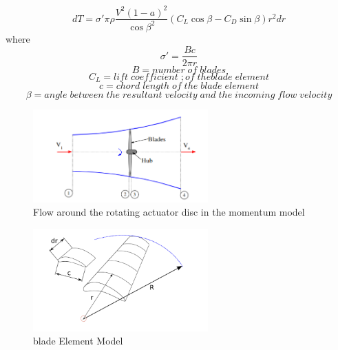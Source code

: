 \documentclass[main.tex]{subfiles}
\begin{document}
$$
dT = \sigma' \pi \rho \frac{V^{2}(1 - a)^2}{\cos{\beta}^2}(C_{L} \cos{\beta} - C_{D} \sin{\beta})r^{2}dr
$$
where
$$
 \sigma'  = \frac{Bc}{2\pi r}
$$
$$
B = number\;of\;blades
$$
$$
C_{L} = lift\;coefficient\;;of\;the blade\;element
$$
$$
c = chord\;length\;of\;the\;blade\;element
$$
$$
\beta = angle\;between\;the\;resultant\;velocity\;and\;the\;incoming\;flow\;velocity
$$

\begin{figure}[h!]
\vspace*{-0.5em}\centering
\includegraphics[width=0.6\textwidth]{./Images/Ass5/actdisc}
\caption{Flow around the rotating actuator disc in the momentum model}\vspace*{-0.5em}
\label{fig2}
\end{figure}\vspace*{-1.0em}

\begin{figure}[h!]
\vspace*{-0.5em}\centering
\includegraphics[width=0.6\textwidth]{./Images/Ass5/blade_element_model}
\caption{blade Element Model}\vspace*{-0.5em}
\label{fig2}
\end{figure}\vspace*{-1.0em}

\newpage
\end{document}
